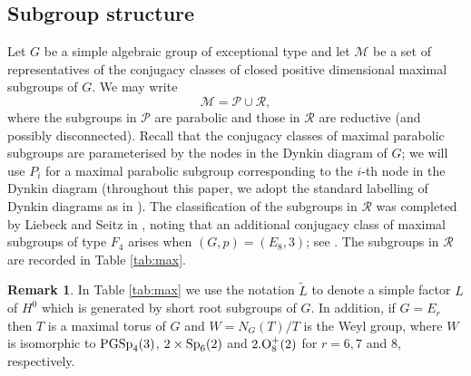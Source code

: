 \documentclass[twoside,a4paper,reqno,11pt]{amsart}
\newcommand{\<}{\langle}
\renewcommand{\>}{\rangle}
\renewcommand{\:}{\colon}
\theoremstyle{plain}
\theoremstyle{definition}
\newtheorem{rem}[thm]{Remark}
\begin{document}
\subsection{Subgroup structure}\label{ss:sub}

Let $G$ be a simple algebraic group of exceptional type and let $\mathcal{M}$ be a set of representatives of the conjugacy classes of closed positive dimensional maximal subgroups of $G$. We may write 
\[
\mathcal{M} = \mathcal{P} \cup \mathcal{R},
\]
where the subgroups in $\mathcal{P}$ are parabolic and those in $\mathcal{R}$ are  reductive (and possibly disconnected). Recall that the conjugacy classes of maximal parabolic subgroups are parameterised by the nodes in the Dynkin diagram of $G$; we will use $P_i$ for a maximal parabolic subgroup corresponding to the $i$-th node in the Dynkin diagram (throughout this paper, we adopt the standard labelling of Dynkin diagrams as in \cite{Bou}). The classification of the subgroups in $\mathcal{R}$ was completed by Liebeck and Seitz in \cite{LS04}, noting that an additional conjugacy class of maximal subgroups of type $F_4$ arises when $(G,p) = (E_8,3)$; see \cite{CST}. The subgroups in $\mathcal{R}$ are recorded in Table \ref{tab:max}. 

\begin{rem}
In Table \ref{tab:max} we use the notation $\tilde{L}$ to denote a simple factor $L$ of $H^0$ which is generated by short root subgroups of $G$. In addition, if $G = E_r$ then $T$ is a maximal torus of $G$ and $W = N_G(T)/T$ is the Weyl group, where $W$ is isomorphic to ${\rm PGSp}_4(3)$, $2 \times {\rm Sp}_6(2)$ and $2.{\rm O}_{8}^{+}(2)$ for $r = 6,7$ and $8$, respectively.
\end{rem}
\end{document}
